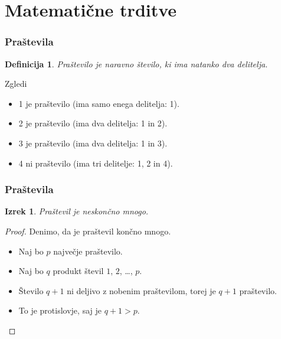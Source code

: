\documentclass{beamer}
\newtheorem{definicija}{Definicija}
\newtheorem{izrek}{Izrek}
\begin{document}
\section{Matematične trditve}


\begin{frame}
   \frametitle{Praštevila}
   \begin{definicija}
      \textrm{Praštevilo} je naravno število, ki ima natanko dva delitelja.
   \end{definicija}
   \begin{exampleblock}{Zgledi}
      \begin{itemize}
         \item 1 je praštevilo (ima samo enega delitelja: 1).
         \item 2 je praštevilo (ima dva delitelja: 1 in 2).
         \item 3 je praštevilo (ima dva delitelja: 1 in 3).
         \item 4 ni praštevilo (ima tri delitelje: 1, 2 in 4).
      \end{itemize}
   \end{exampleblock}
\end{frame}


\begin{frame}
   \frametitle{Praštevila}
   \begin{izrek}
      Praštevil je neskončno mnogo.
   \end{izrek}
   \begin{proof}
      Denimo, da je praštevil končno mnogo.
      \begin{itemize}
         \item Naj bo $p$ največje praštevilo.
         \item Naj bo $q$ produkt števil $1$, $2$, \ldots, $p$.
         \item Število $q+1$ ni deljivo z nobenim praštevilom, torej je $q+1$ praštevilo.
         \item To je protislovje, saj je $q+1>p$. \qedhere
      \end{itemize}
   \end{proof}
\end{frame}

\end{document}
